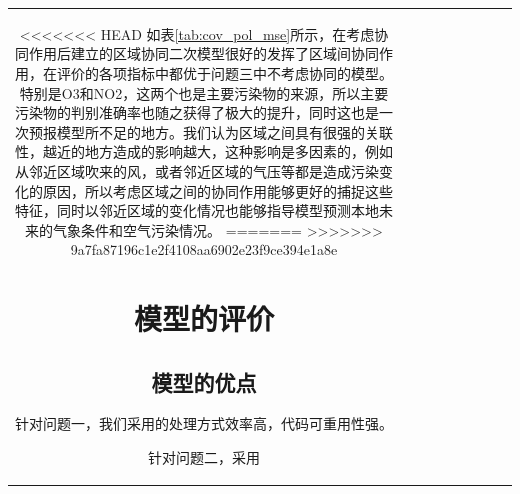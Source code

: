 \documentclass[bwprint]{gmcmthesis}
\numberwithin{figure}{section}
\begin{document}
\begin{table}
\begin{center}
{\begin{tabular}[ht]{|c|c|c|c|c|c|c|c|c|}
<<<<<<< HEAD
如表\ref{tab:cov_pol_mse}所示，在考虑协同作用后建立的区域协同二次模型很好的发挥了区域间协同作用，在评价的各项指标中都优于问题三中不考虑协同的模型。特别是O3和NO2，这两个也是主要污染物的来源，所以主要污染物的判别准确率也随之获得了极大的提升，同时这也是一次预报模型所不足的地方。我们认为区域之间具有很强的关联性，越近的地方造成的影响越大，这种影响是多因素的，例如从邻近区域吹来的风，或者邻近区域的气压等都是造成污染变化的原因，所以考虑区域之间的协同作用能够更好的捕捉这些特征，同时以邻近区域的变化情况也能够指导模型预测本地未来的气象条件和空气污染情况。
=======
>>>>>>> 9a7fa87196c1e2f4108aa6902e23f9ce394e1a8e
\section{模型的评价}
\subsection{模型的优点}

针对问题一，我们采用的处理方式效率高，代码可重用性强。

针对问题二，采用


\end{tabular}}
\end{center}
\end{table}
\end{document}
